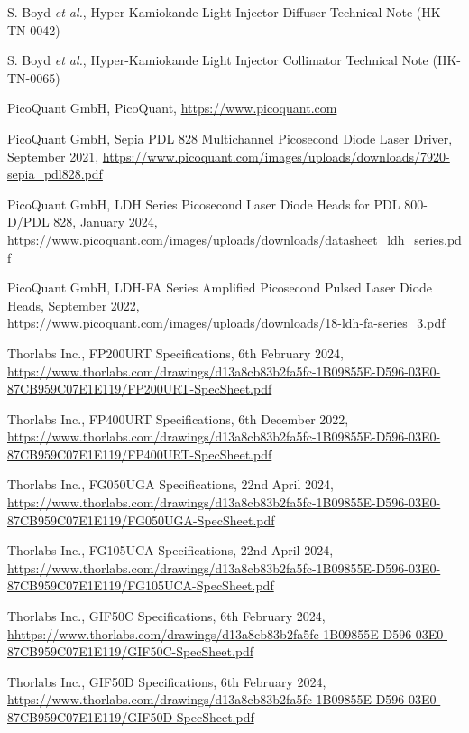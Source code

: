 \documentclass[a4paper,11pt]{article}
\begin{document}
\newpage
\begin{thebibliography}{99}

S. Boyd {\it et al.}, Hyper-Kamiokande Light Injector Diffuser Technical Note (HK-TN-0042)

S. Boyd {\it et al.}, Hyper-Kamiokande Light Injector Collimator Technical Note (HK-TN-0065)

PicoQuant GmbH, PicoQuant, \url{https://www.picoquant.com}

PicoQuant GmbH, Sepia PDL 828 Multichannel Picosecond Diode Laser Driver, September 2021, \url{https://www.picoquant.com/images/uploads/downloads/7920-sepia_pdl828.pdf}

PicoQuant GmbH, LDH Series Picosecond Laser Diode Heads for PDL 800-D/PDL 828, January 2024, \url{https://www.picoquant.com/images/uploads/downloads/datasheet_ldh_series.pdf}

PicoQuant GmbH, LDH-FA Series Amplified Picosecond Pulsed Laser Diode Heads, September 2022, \url{https://www.picoquant.com/images/uploads/downloads/18-ldh-fa-series_3.pdf}

Thorlabs Inc., FP200URT Specifications, 6th February 2024, \url{https://www.thorlabs.com/drawings/d13a8cb83b2fa5fc-1B09855E-D596-03E0-87CB959C07E1E119/FP200URT-SpecSheet.pdf}

Thorlabs Inc., FP400URT Specifications, 6th December 2022, \url{https://www.thorlabs.com/drawings/d13a8cb83b2fa5fc-1B09855E-D596-03E0-87CB959C07E1E119/FP400URT-SpecSheet.pdf}

Thorlabs Inc., FG050UGA Specifications, 22nd April 2024, \url{https://www.thorlabs.com/drawings/d13a8cb83b2fa5fc-1B09855E-D596-03E0-87CB959C07E1E119/FG050UGA-SpecSheet.pdf}

Thorlabs Inc., FG105UCA Specifications, 22nd April 2024, \url{https://www.thorlabs.com/drawings/d13a8cb83b2fa5fc-1B09855E-D596-03E0-87CB959C07E1E119/FG105UCA-SpecSheet.pdf}

Thorlabs Inc., GIF50C Specifications, 6th February 2024, \url{hhttps://www.thorlabs.com/drawings/d13a8cb83b2fa5fc-1B09855E-D596-03E0-87CB959C07E1E119/GIF50C-SpecSheet.pdf}

Thorlabs Inc., GIF50D Specifications, 6th February 2024, \url{https://www.thorlabs.com/drawings/d13a8cb83b2fa5fc-1B09855E-D596-03E0-87CB959C07E1E119/GIF50D-SpecSheet.pdf}



\end{thebibliography}
\end{document}
